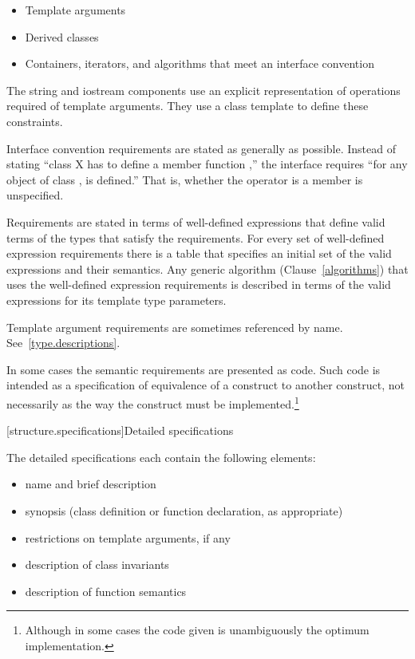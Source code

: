 \begin{itemize}
\item Template arguments
\item Derived classes
\item Containers, iterators, and algorithms that meet an interface convention
\end{itemize}

\pnum
The string and iostream components use an explicit representation of operations
required of template arguments. They use a class template  to
define these constraints.

\pnum
Interface convention requirements are stated as generally as possible. Instead
of stating ``class X has to define a member function ,'' the
interface requires ``for any object  of class ,  is
defined.'' That is, whether the operator is a member is unspecified.

\pnum
Requirements are stated in terms of well-defined expressions that define valid terms of
the types that satisfy the requirements. For every set of well-defined expression
requirements there is a table that specifies an initial set of the valid expressions and
their semantics. Any generic algorithm (Clause~\ref{algorithms}) that uses the
well-defined expression requirements is described in terms of the valid expressions for
its template type parameters.

\pnum
Template argument requirements are sometimes referenced by name.
See~\ref{type.descriptions}.

\pnum
In some cases the semantic requirements are presented as \Cpp code.
Such code is intended as a
specification of equivalence of a construct to another construct, not
necessarily as the way the construct
must be implemented.\footnote{Although in some cases the code given is
unambiguously the optimum implementation.}

[structure.specifications]{Detailed specifications}

\pnum
The detailed specifications each contain the following elements:%

\begin{itemize}
\item name and brief description
\item synopsis (class definition or function declaration, as appropriate)
\item restrictions on template arguments, if any
\item description of class invariants
\item description of function semantics
\end{itemize}

